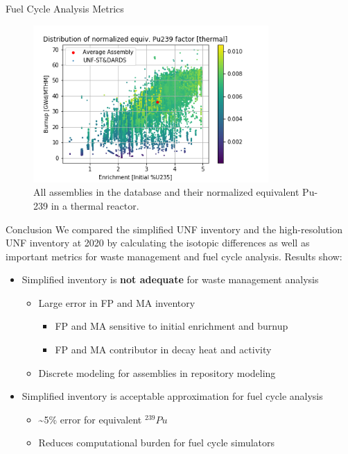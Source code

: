 \documentclass[final]{beamer}
\newlength{\onecolwid}
\newlength{\threecolwid}
\begin{document}
\begin{frame}[t]
\begin{columns}[t,totalwidth=\threecolwid]
\begin{column}{\onecolwid}
\begin{block}{Fuel Cycle Analysis Metrics}
\begin{figure}
    \centering
    \includegraphics[width=0.8\textwidth]{../images/thermal_all.png}
    \caption{All assemblies in the database and their normalized equivalent Pu-239 in a thermal reactor.}
    \label{fig:thermal_all}
\end{figure}
\end{block}

\begin{block}{Conclusion}
We compared the simplified \gls{UNF}
inventory and the high-resolution \gls{UNF} inventory
at 2020 by calculating the isotopic differences as well
as important metrics for waste management and fuel cycle analysis. Results show:
\begin{itemize}
    \item Simplified inventory is \textbf{not adequate} for waste management analysis
    \begin{itemize}
        \item Large error in FP and MA inventory
        \begin{itemize}
            \item FP and MA sensitive to initial enrichment and burnup
            \item FP and MA contributor in decay heat and activity
        \end{itemize}
        \item Discrete modeling for assemblies in repository modeling
    \end{itemize}
    \item Simplified inventory is acceptable approximation for fuel cycle analysis
    \begin{itemize}
        \item \textasciitilde 5\% error for equivalent $^{239}Pu$
        \item Reduces computational burden for fuel cycle simulators
    \end{itemize}


\end{itemize}
\end{block}
\end{column}
\end{columns}
\end{frame}
\end{document}
